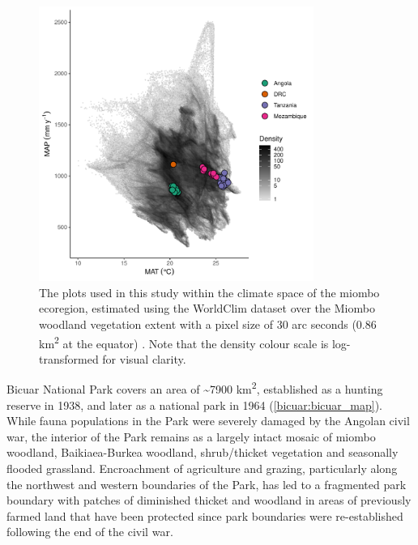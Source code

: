 \begin{refsection}
\begin{figure}
	\includegraphics[width=0.8\textwidth]{img/temp_precip}
	\caption[Plots in climate space of miombo ecoregion]{The plots used in this study within the climate space of the miombo ecoregion, estimated using the WorldClim dataset over the Miombo woodland vegetation extent with a pixel size of 30 arc seconds (0.86 km\textsuperscript{2} at the equator) \citep{Fick2017}. Note that the density colour scale is log-transformed for visual clarity.}
	\label{bicuar:temp_precip}
\end{figure}



Bicuar National Park covers an area of \textasciitilde{}7900 km\textsuperscript{2}, established as a hunting reserve in 1938, and later as a national park in 1964 (\autoref{bicuar:bicuar_map}). While fauna populations in the Park were severely damaged by the Angolan civil war, the interior of the Park remains as a largely intact mosaic of miombo woodland, Baikiaea-Burkea woodland, shrub/thicket vegetation and seasonally flooded grassland. Encroachment of agriculture and grazing, particularly along the northwest and western boundaries of the Park, has led to a fragmented park boundary with patches of diminished thicket and woodland in areas of previously farmed land that have been protected since park boundaries were re-established following the end of the civil war.


\end{refsection}
